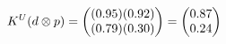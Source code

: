 \documentclass[preview]{standalone}
\begin{document}
\begin{align*}
\special{dvisvgm:raw <g id='unique000'>}K^U(d \otimes p) = \begin{pmatrix} (0.95)(0.92) \\ (0.79)(0.30) \end{pmatrix} = \begin{pmatrix} 0.87 \\ 0.24 \end{pmatrix}\special{dvisvgm:raw </g>}
\end{align*}
\end{document}
